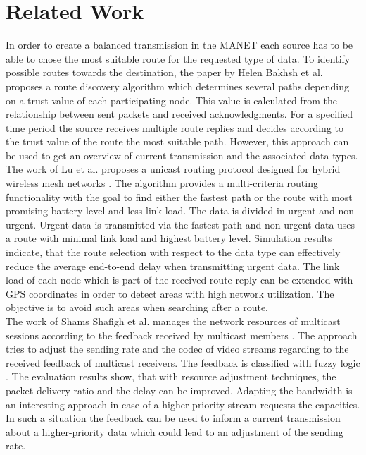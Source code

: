 \documentclass[runningheads]{llncs}
\newcommand{\MANET}{MANET}
\newcommand{\VOIP}{VoIP}
\begin{document}
	\section{Related Work}
	In order to create a balanced transmission in the \MANET{} each source has to be able to chose the most suitable route for the requested type of data. To identify possible routes towards the destination, the paper by Helen Bakhsh et al. \cite{RelatedWork:MultiPath} proposes a route discovery algorithm which determines several paths depending on a trust value of each participating node. This value is calculated from the relationship between sent packets and received acknowledgments. For a specified time period the source receives multiple route replies and decides according to the trust value of the route the most suitable path. However, this approach can be used to get an overview of current transmission and the associated data types.\\
	The work of Lu et al. \cite{RelatedWork:QoSWMN} proposes a unicast routing protocol designed for hybrid wireless mesh networks \cite{RelatedWorkContent:WMN}. The algorithm provides a multi-criteria routing functionality with the goal to find either the fastest path or the route with most promising battery level and less link load. The data is divided in urgent and non-urgent. Urgent data is transmitted via the fastest path and non-urgent data uses a route with minimal link load and highest battery level. Simulation results indicate, that the route selection with respect to the data type can effectively reduce the average end-to-end delay when transmitting urgent data. The link load of each node which is part of the received route reply can be extended with GPS coordinates in order to detect areas with high network utilization. The objective is to avoid such areas when searching after a route.\\
	The work of Shams Shafigh et al. manages the network resources of multicast sessions according to the  feedback received by multicast members \cite{ReleatedWork:QoSSessionAdaptation}. The approach tries to adjust the sending rate and the codec of video streams regarding to the received feedback of multicast receivers. The feedback is classified with fuzzy logic \cite{RelatedWorkContent:QoSSessionAdaptationFuzzySets}\cite{RelatedWorkContent:QoSSessionAdaptationFuzzySets2}. The evaluation results show, that with resource adjustment techniques, the packet delivery ratio and the delay can be improved. Adapting the bandwidth is an interesting approach in case of a higher-priority stream requests the capacities. In such a situation the feedback can be used to inform a current transmission about a higher-priority data which could lead to an adjustment of the sending rate.
\end{document}

